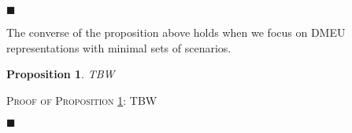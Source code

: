 \documentclass[12pt, notitlepage]{article}
\newtheorem{proposition}{Proposition}
\begin{document}
\begin{flushleft}
{$\blacksquare $\linebreak }
\end{flushleft}

The converse of the proposition above holds when we focus on DMEU
representations with minimal sets of scenarios.

\begin{proposition}
\label{css}TBW
\end{proposition}

{\textsc{Proof of Proposition \ref{css}}: TBW}

\begin{flushleft}
{$\blacksquare $\linebreak }
\end{flushleft}
\end{document}
